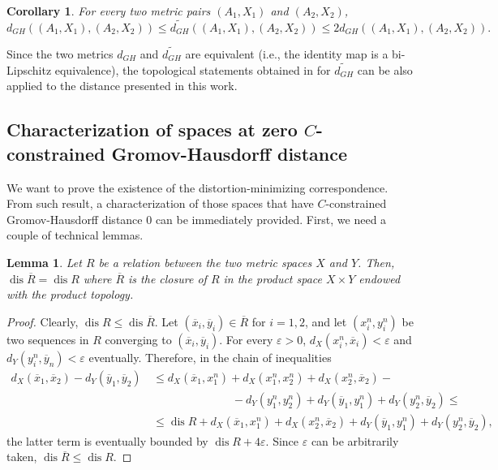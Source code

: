 \documentclass[8pt,a4paper,oneside,english,english]{article}
\theoremstyle{plain}
\theoremstyle
{plain}
\newtheorem{lemma}[theorem]{Lemma}%
\newtheorem{corollary}[theorem]{Corollary}%
\theoremstyle{definition}
\newcommand{\GH}{d_{GH}}
\DeclareMathOperator{\dis}{dis}
\begin{document}
\begin{corollary}\label{coro:GH_metric_pairs}
	For every two metric pairs $(A_1,X_1)$ and $(A_2,X_2)$,
	\begin{equation*}
		\GH((A_1,X_1),(A_2,X_2))\leq\widetilde{\GH}((A_1,X_1),(A_2,X_2))\leq 2\GH((A_1,X_1),(A_2,X_2)).
	\end{equation*}
\end{corollary}

Since the two metrics $\GH$ and $\widetilde{\GH}$ are equivalent (i.e., the identity map is a bi-Lipschitz equivalence), the topological statements obtained in \cite{GomChe} for $\widetilde{\GH}$ can be also applied to the distance presented in this work.



\subsection{Characterization of spaces at zero $C$-constrained Gromov-Hausdorff distance}\label{sub:inf_is_min}

We want to prove the existence of the distortion-minimizing correspondence. From such result, a characterization of those spaces that have $C$-constrained Gromov-Hausdorff distance $0$ can be immediately provided. First, we need a couple of technical lemmas.

\begin{lemma}\label{lemma:closure_same_distortion}
    Let $R$ be a relation between the two metric spaces $X$ and $Y$. Then, $\dis\overline R=\dis R$ where $\overline R$ is the closure of $R$ in the product space $X\times Y$ endowed with the product topology.
\end{lemma}
\begin{proof}
    Clearly, $\dis R\leq\dis\overline R$. Let $(\overline x_i,\overline y_i)\in\overline R$ for $i=1,2$, and let $(x_i^n,y_i^n)$ be two sequences in $R$ converging to $(\overline x_i,\overline y_i)$. For every $\varepsilon>0$, $d_X(x_i^n,\overline x_i)<\varepsilon$ and $d_Y(y_i^n,\overline y_n)<\varepsilon$ eventually. Therefore, in the chain of inequalities
    \[
        \begin{aligned}
        d_X(\overline x_1,\overline x_2)-d_Y(\overline y_1,\overline y_2)&\,\leq d_X(\overline x_1,x_1^n)+d_X(x_1^n,x_2^n)+d_X(x_2^n,\overline x_2)-\\
        &\hspace{3cm}-d_Y(y_1^n,y_2^n)+d_Y(\overline y_1,y_1^n)+d_Y(y_2^n,\overline y_2)\leq\\
        &\,\leq \dis R+d_X(\overline x_1,x_1^n)+d_X(x_2^n,\overline x_2)+d_Y(\overline y_1,y_1^n)+d_Y(y_2^n,\overline y_2),
        \end{aligned}
    \]
    the latter term is eventually bounded by $\dis R+4\varepsilon$. Since $\varepsilon$ can be arbitrarily taken, $\dis\overline R\leq\dis R$.
\end{proof}
\end{document}
